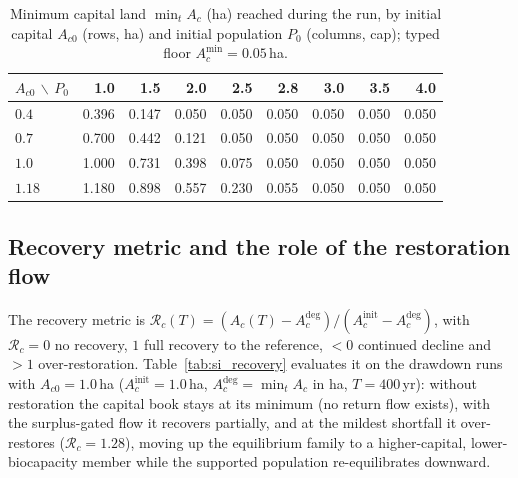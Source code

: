 \documentclass[11pt,a4paper]{article}
\newcommand{\Acmin}{A_c^{\min}}
\begin{document}
\begin{table}[htbp]
\centering\small
\caption{Minimum capital land $\min_tA_c$ (ha) reached during the run, by initial capital $A_{c0}$ (rows, ha) and initial population $P_0$ (columns, cap); typed floor $\Acmin=0.05$\,ha.}
\label{tab:si_drawdown}
\begin{tabular}{lrrrrrrrr}
\toprule
$A_{c0}$ $\backslash$ $P_0$ & 1.0 & 1.5 & 2.0 & 2.5 & 2.8 & 3.0 & 3.5 & 4.0 \\
\midrule
$0.4$ & 0.396 & 0.147 & 0.050 & 0.050 & 0.050 & 0.050 & 0.050 & 0.050 \\
$0.7$ & 0.700 & 0.442 & 0.121 & 0.050 & 0.050 & 0.050 & 0.050 & 0.050 \\
$1.0$ & 1.000 & 0.731 & 0.398 & 0.075 & 0.050 & 0.050 & 0.050 & 0.050 \\
$1.18$ & 1.180 & 0.898 & 0.557 & 0.230 & 0.055 & 0.050 & 0.050 & 0.050 \\
\bottomrule
\end{tabular}
\end{table}

\subsection{Recovery metric and the role of the restoration flow}\label{si:recovery}

The recovery metric is $\mathcal R_c(T)=(A_c(T)-A_c^{\mathrm{deg}})/(A_c^{\mathrm{init}}-A_c^{\mathrm{deg}})$, with $\mathcal R_c=0$ no recovery, $1$ full recovery to the reference, $<0$ continued decline and $>1$ over-restoration. Table~\ref{tab:si_recovery} evaluates it on the drawdown runs with $A_{c0}=1.0$\,ha ($A_c^{\mathrm{init}}=1.0$\,ha, $A_c^{\mathrm{deg}}=\min_tA_c$ in ha, $T=400$\,yr): without restoration the capital book stays at its minimum (no return flow exists), with the surplus-gated flow it recovers partially, and at the mildest shortfall it over-restores ($\mathcal R_c=1.28$), moving up the equilibrium family to a higher-capital, lower-biocapacity member while the supported population re-equilibrates downward.
\end{document}
